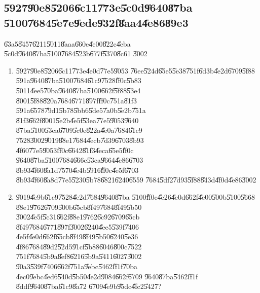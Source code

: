 \documentclass[12pt,a4paper]{article}
\begin{document}
\bigskip

\subsection{\U{5927}\U{90e8}\U{5206}\U{6c11}\U{773e}\U{5c0d}\U{9640}\U{87ba}%
\U{5100}\U{7684}\U{5e7e}\U{9ede}\U{932f}\U{8aa4}\U{4e86}\U{89e3}}

\U{63a5}\U{8457}\U{6211}\U{5011}\U{8aaa}\U{660e}\U{4e00}\U{822c}\U{4eba}%
\U{5c0d}\U{9640}\U{87ba}\U{5100}\U{7684}\U{523b}\U{677f}\U{5370}\U{8c61}%
\U{3002}

\begin{enumerate}
\item \U{5927}\U{90e8}\U{5206}\U{6c11}\U{773e}\U{4e0d}\U{77e5}\U{9053}%
\U{76ee}\U{524d}\U{65e5}\U{5e38}\U{751f}\U{6d3b}\U{4e2d}\U{6709}\U{5f88}%
\U{591a}\U{9640}\U{87ba}\U{5100}\U{7684}\U{61c9}\U{7528}\U{ff0c}\U{5b83}%
\U{5011}\U{4ee5}\U{70ba}\U{9640}\U{87ba}\U{5100}\U{662f}\U{5f88}\U{53e4}%
\U{8001}\U{5f88}\U{820a}\U{7684}\U{6771}\U{897f}\U{ff0c}\U{751a}\U{81f3}%
\U{591a}\U{6578}\U{79d1}\U{5b78}\U{5bb6}\U{5de5}\U{7a0b}\U{5e2b}\U{751a}%
\U{81f3}\U{662f}\U{8001}\U{5e2b}\U{4e5f}\U{53ea}\U{77e5}\U{9053}\U{9640}%
\U{87ba}\U{5100}\U{53ea}\U{6709}\U{5c0e}\U{822a}\U{4e0a}\U{7684}\U{61c9}%
\U{7528}\U{3002}\U{9019}\U{88e1}\U{7684}\U{4ecb}\U{7d39}\U{6703}\U{8b93}%
\U{4f60}\U{77e5}\U{9053}\U{ff0c}\U{6642}\U{81f3}\U{4eca}\U{65e5}\U{ff0c}%
\U{9640}\U{87ba}\U{5100}\U{7684}\U{666e}\U{53ca}\U{9664}\U{4e86}\U{6703}%
\U{8b93}\U{4f60}\U{8a1d}\U{7570}\U{4e4b}\U{5916}\U{ff0c}\U{4e5f}\U{6703}%
\U{8b93}\U{4f60}\U{8a8d}\U{77e5}\U{5230}\U{5b78}\U{6821}\U{6240}\U{6559}%
\U{7684}\U{5df2}\U{7d93}\U{5f88}\U{843d}\U{4f0d}\U{4e86}\U{3002}

\item \U{9019}\U{4e9b}\U{61c9}\U{7528}\U{4e2d}\U{7684}\U{9640}\U{87ba}%
\U{5100}\U{ff0c}\U{4e26}\U{4e0d}\U{662f}\U{4e00}\U{500b}\U{5100}\U{5668}%
\U{88e1}\U{9762}\U{6709}\U{500b}\U{65cb}\U{8f49}\U{7684}\U{8f49}\U{5b50}%
\U{3002}\U{4e5f}\U{5c31}\U{662f}\U{88e1}\U{9762}\U{6c92}\U{6709}\U{65cb}%
\U{8f49}\U{7684}\U{6771}\U{897f}\U{3002}\U{6240}\U{4ee5}\U{539f}\U{7406}%
\U{4e5f}\U{4e0d}\U{662f}\U{65cb}\U{8f49}\U{8f49}\U{5b50}\U{6240}\U{5e36}%
\U{4f86}\U{7684}\U{89d2}\U{52d5}\U{91cf}\U{5b88}\U{6046}\U{800c}\U{7522}%
\U{751f}\U{7684}\U{5b9a}\U{8ef8}\U{6216}\U{5b9a}\U{5411}\U{6027}\U{3002}%
\U{90a3}\U{539f}\U{7406}\U{662f}\U{751a}\U{9ebc}\U{5462}\U{ff1f}\U{70ba}%
\U{4ec0}\U{9ebc}\U{4ed6}\U{540d}\U{5b50}\U{4e2d}\U{9084}\U{662f}\U{6709}%
\U{9640}\U{87ba}\U{5462}\U{ff1f} \U{8ddf}\U{9640}\U{87ba}\U{61c9}\U{8a72}%
\U{6709}\U{4e9b}\U{95dc}\U{4fc2}\U{5427}?


\end{enumerate}
\end{document}
